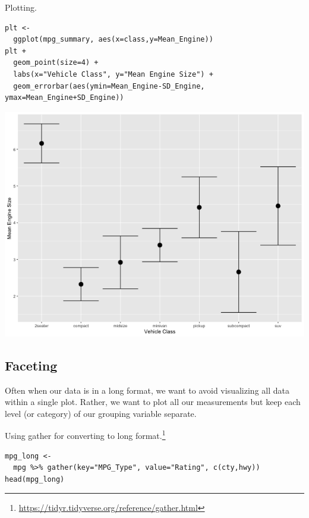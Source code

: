 \documentclass[11pt]{article}
\begin{document}
Plotting.

\begin{verbatim}
plt <-
  ggplot(mpg_summary, aes(x=class,y=Mean_Engine))
plt +
  geom_point(size=4) +
  labs(x="Vehicle Class", y="Mean Engine Size") +
  geom_errorbar(aes(ymin=Mean_Engine-SD_Engine, ymax=Mean_Engine+SD_Engine))
\end{verbatim}

\begin{org}
\begin{center}
\includegraphics[width=.9\linewidth]{./resources/mpg_layer3.png}
\end{center}
\end{org}

\subsection{Faceting}
\label{sec:orgbc3641c}

Often when our data is in a long format, we want to avoid visualizing all data within a single plot. Rather, we want to plot all our measurements but keep each level (or category) of our grouping variable separate.

Using gather for converting to long format.\footnote{\url{https://tidyr.tidyverse.org/reference/gather.html}}

\begin{verbatim}
mpg_long <-
  mpg %>% gather(key="MPG_Type", value="Rating", c(cty,hwy))
head(mpg_long)
\end{verbatim}
\end{document}
